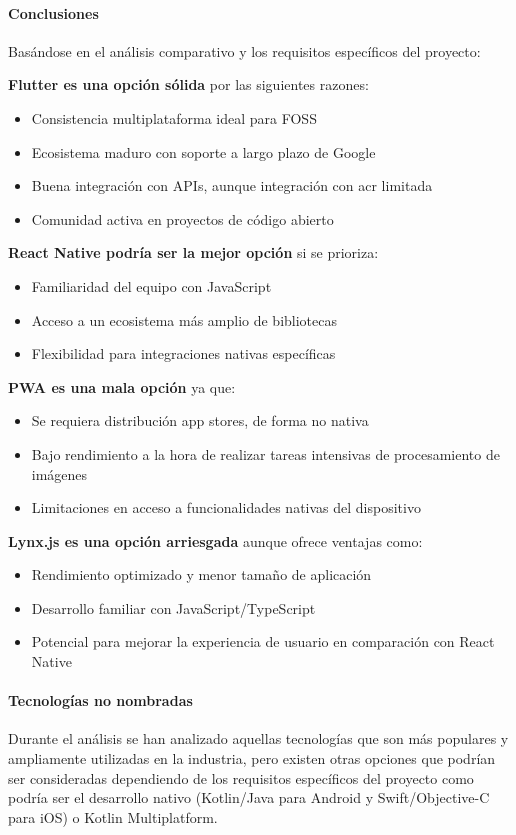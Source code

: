 \paragraph{Conclusiones}
Basándose en el análisis comparativo y los requisitos específicos del proyecto:

\textbf{Flutter es una opción sólida} por las siguientes razones:
\begin{itemize}
    \item Consistencia multiplataforma ideal para FOSS
    \item Ecosistema maduro con soporte a largo plazo de Google
    \item Buena integración con APIs, aunque integración con \acrfull{acr} limitada
    \item Comunidad activa en proyectos de código abierto
\end{itemize}

\textbf{React Native podría ser la mejor opción} si se prioriza:
\begin{itemize}
    \item Familiaridad del equipo con JavaScript
    \item Acceso a un ecosistema más amplio de bibliotecas
    \item Flexibilidad para integraciones nativas específicas
\end{itemize}

\textbf{PWA es una mala opción} ya que:
\begin{itemize}
    \item Se requiera distribución app stores, de forma no nativa
    \item Bajo rendimiento a la hora de realizar tareas intensivas de procesamiento de imágenes
    \item Limitaciones en acceso a funcionalidades nativas del dispositivo
\end{itemize}

\textbf{Lynx.js es una opción arriesgada} aunque ofrece ventajas como:
\begin{itemize}
    \item Rendimiento optimizado y menor tamaño de aplicación
    \item Desarrollo familiar con JavaScript/TypeScript
    \item Potencial para mejorar la experiencia de usuario en comparación con React Native
\end{itemize}


\paragraph{Tecnologías no nombradas}
Durante el análisis se han analizado aquellas tecnologías que son más populares y ampliamente utilizadas en la industria, pero existen otras opciones que podrían ser consideradas dependiendo de los requisitos específicos del proyecto como podría ser el desarrollo nativo (Kotlin/Java para Android y Swift/Objective-C para iOS) o Kotlin Multiplatform.

